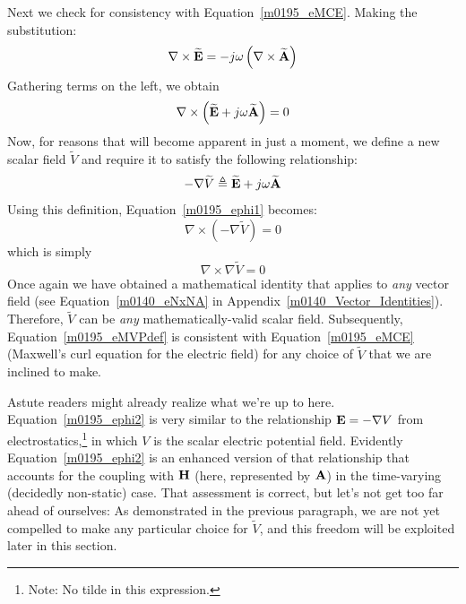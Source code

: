 Next we check for consistency with Equation~\ref{m0195_eMCE}.  Making the substitution:
%
\begin{equation}
\nabla \times  \widetilde{\bf E} = -j\omega\left(\nabla \times \widetilde{\bf A}\right)
\end{equation}
%
Gathering terms on the left, we obtain
%
\begin{equation}
\nabla \times  \left( \widetilde{\bf E} +j\omega \widetilde{\bf A} \right) = 0
\label{m0195_ephi1}
\end{equation}
%
Now, for reasons that will become apparent in just a moment, we define a new scalar field $\widetilde{V}$ and require it to satisfy the following relationship:
%
\begin{equation}
-\nabla\widetilde{V} \triangleq \widetilde{\bf E} +j\omega \widetilde{\bf A}
\label{m0195_ephi2} 
\end{equation}
%
Using this definition, Equation~\ref{m0195_ephi1} becomes:
%
\begin{equation}
\nabla \times  \left( -\nabla\widetilde{V} \right) = 0
\end{equation}
%
which is simply
%
\begin{equation}
\nabla \times  \nabla\widetilde{V} = 0
\end{equation}
%
Once again we have obtained a mathematical identity that applies to \emph{any} vector field (see Equation~\ref{m0140_eNxNA} in Appendix~\ref{m0140_Vector_Identities}).
Therefore, $\widetilde{V}$ can be \emph{any} mathematically-valid scalar field.
Subsequently, Equation~\ref{m0195_eMVPdef} is consistent with Equation~\ref{m0195_eMCE} (Maxwell's curl equation for the electric field) for any choice of $\widetilde{V}$ that we are inclined to make. 

Astute readers might already realize what we're up to here.  
Equation~\ref{m0195_ephi2} is very similar to the relationship ${\bf E} = -\nabla V$ from electrostatics,\footnote{Note: No tilde in this expression.} in which $V$ is the scalar electric potential field.
Evidently Equation~\ref{m0195_ephi2} is an enhanced version of that relationship that accounts for the coupling with ${\bf H}$ (here, represented by ${\bf A}$) in the time-varying (decidedly non-static) case.
That assessment is correct, but let's not get too far ahead of ourselves:  As demonstrated in the previous paragraph, we are not yet compelled to make any particular choice for $\widetilde{V}$, and this freedom will be exploited later in this section.

